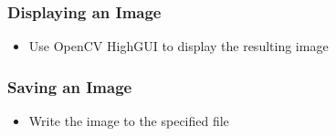 \begin{frame}
\frametitle{Displaying an Image}
\begin{center}
\begin{itemize}
\item Use OpenCV HighGUI to display the resulting image
\end{itemize}

\end{center}
\end{frame}


\begin{frame}
\frametitle{Saving an Image}
\begin{center}
\begin{itemize}
\item Write the image to the specified file
\end{itemize}

\end{center}
\end{frame}
